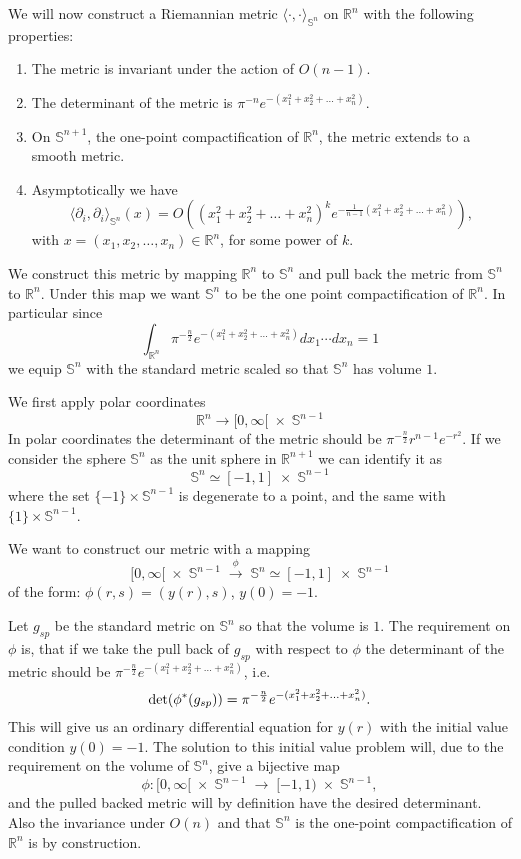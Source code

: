 \documentclass[letterpaper,12pt]{article}
\newcommand{\R}{\mathbb{ R}}
\begin{document}
We will now construct a Riemannian metric $\langle \cdot , \cdot \rangle_{\mathbb{S}^{n}} $ on $\mathbb{R}^n$ with the following properties:
\begin{enumerate}
    \item The metric is invariant under the action of $O(n-1)$.
    \item The determinant of the metric is $\pi^{-n}e^{-(x_1^2+x_2^2+\ldots +x_n^2)}$.
    \item On $\mathbb{S}^{n+1}$, the one-point compactification of $\mathbb{R}^n$, the metric extends to a smooth metric.  
    \item Asymptotically we have 
    $$ \langle \partial_i,\partial_i  \rangle_{\mathbb{S}^{n}} (x) = O( (x_1^2+x_2^2+\ldots +x_n^2)^ke^{-\frac{1}{n-1}(x_1^2+x_2^2+\ldots +x_n^2)}),  $$
    with $x=(x_1,x_2,\ldots ,x_n)\in \mathbb{R}^n$, for some power of $k$.
\end{enumerate}

We construct this metric by mapping $\R^n$ to $\mathbb{S}^n$ and pull back the metric from $\mathbb{S}^n$ to $\R^n$. Under this map we want $\mathbb{S}^n$ to be the one point compactification of $\R^n$. In particular since
$$ \int_{\R^n} \pi^{-\frac{n}{2}}e^{-(x_1^2+x_2^2+\ldots +x_n^2)} dx_1\cdots dx_n =1$$
we equip $\mathbb{S}^n$ with the standard metric scaled so that $\mathbb{S}^n$  has volume $1$.


We first apply polar coordinates 
$$
\mathbb{R}^n\rightarrow [ 0,\infty[ \;\times\; \mathbb{S}^{n-1}
$$
In polar coordinates the determinant of the metric should be $\pi^{-\frac{n}{2}} r^{n-1} e^{-r^2}$.
If we consider the sphere $\mathbb{S}^n$ as the unit sphere in $\R^{n+1}$ we can identify it as 
$$ \mathbb{S}^{n} \simeq [-1,1] \;\times\; \mathbb{S}^{n-1}  $$
where the set $\{-1\}\times \mathbb{S}^{n-1} $ is degenerate to a point, and the same with  $\{1\}\times \mathbb{S}^{n-1} $.

We want to construct our metric with a mapping  
$$
[ 0,\infty[\; \times\; \mathbb{S}^{n-1} \;\stackrel{\phi}{\longrightarrow}\; \mathbb{S}^{n} \simeq [-1,1] \;\times\; \mathbb{S}^{n-1}
$$
of the form: $\phi(r,s)= (y(r),s)$, $y(0)=-1$. 

Let $g_{sp}$ be the standard metric on $\mathbb{S}^n$ so that the volume is $1$. The requirement on $\phi$ is, that if we take the pull back of $g_{sp}$ with respect to $\phi$ the determinant of the metric should be  $\pi^{-\frac{n}{2}}e^{-(x_1^2+x_2^2+\ldots +x_n^2)}$, i.e. 
$$\hbox{det} (\phi^*(g_{sp}))=\pi^{-\frac{n}{2}}e^{-(x_1^2+x_2^2+\ldots +x_n^2)}. $$
This will give us an ordinary differential equation for $y(r)$ with the initial value condition $y(0)=-1$. The solution to this initial value problem  will, due to the requirement on the volume of $\mathbb{S}^n$, give a bijective map 
$$\phi : [ 0,\infty[\; \times\; \mathbb{S}^{n-1} \;\longrightarrow\;  [-1,1) \;\times\; \mathbb{S}^{n-1} ,$$
and the pulled backed metric will by definition have the desired determinant. Also the invariance under $O(n)$ and that $\mathbb{S}^n$ is the one-point compactification of $\R^n$ is by construction. 
\\
\end{document}
